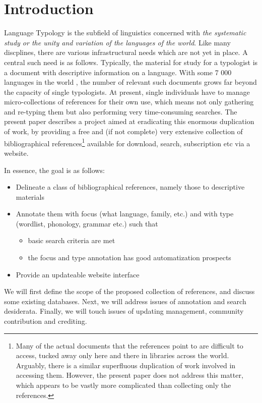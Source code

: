 \documentclass[english,11pt,twoside]{article}
\begin{document}
\section{Introduction}
Language Typology is the subfield of linguistics concerned with
\emph{the systematic study or the unity and variation of the languages
  of the world}. Like many discplines, there are various
infrastructural needs which are not yet in place. A central such need
is as follows. Typically, the material for study for a typologist is a
document with descriptive information on a language. With some 7 000
languages in the world \citep{h:Ethnologue:16}, the number of relevant
such documents grows far beyond the capacity of single typologists. At
present, single individuals have to manage micro-collections of
references for their own use, which means not only gathering and
re-typing them but also performing very time-consuming searches. The
present paper describes a project aimed at eradicating this enormous
duplication of work, by providing a free and (if not complete) very
extensive collection of bibliographical references\footnote{Many of
  the actual documents that the references point to are difficult to
  access, tucked away only here and there in libraries across the
  world. Arguably, there is a similar superfluous duplication of work
  involved in accessing them. However, the present paper does not
  address this matter, which appears to be vastly more complicated
  than collecting only the references.} available for download,
search, subscription etc via a website.

In essence, the goal is as follows:
\begin{itemize}
\item Delineate a class of bibliographical references, namely those to
  descriptive materials
\item Annotate them with focus (what language, family, etc.) and with
  type (wordlist, phonology, grammar etc.) such that
\begin{itemize}
\item basic search criteria are met
\item the focus and type annotation has good automatization prospects
\end{itemize}
\item Provide an updateable website interface
\end{itemize}

We will first define the scope of the proposed collection of
references, and discuss some existing databases. Next, we will address
issues of annotation and search desiderata. Finally, we will
touch issues of updating management, community contribution and
crediting.
\end{document}
